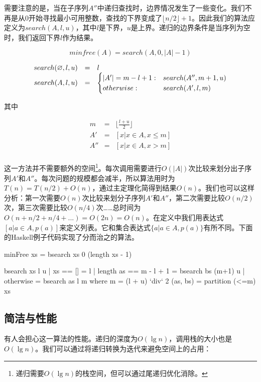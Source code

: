 \documentclass[b5paper]{ctexart}
\begin{document}
需要注意的是，当在子序列$A''$中递归查找时，边界情况发生了一些变化。我们不再是从0开始寻找最小可用整数，查找的下界变成了$\lfloor n/2 \rfloor + 1$。因此我们的算法应定义为$search(A, l, u)$，其中$l$是下界，$u$是上界。递归的边界条件是当序列为空时，我们返回下界$l$作为结果。

\[
minfree(A) = search(A, 0, |A|-1)
\]

\[
\begin{array}{rcl}
search(\varnothing, l, u) & = & l \\
search(A, l, u) & = & \begin{cases}
       |A'| = m - l + 1 : & search(A'', m+1, u) \\
       otherwise : & search(A',  l, m) \\
\end{cases}
\end{array}
\]

其中

\[ \begin{array}{rcl}
m & = & \displaystyle \lfloor \frac{l+u}{2} \rfloor \\
A' & = & [ x | x \in A, x \leq m ] \\
A''& = & [ x | x \in A, x > m ] \\
\end{array} \]

这一方法并不需要额外的空间\footnote{递归需要$O(\lg n)$的栈空间，但可以通过尾递归优化消除。}。每次调用需要进行$O(|A|)$次比较来划分出子序列$A'$和$A''$。每次问题的规模都会减半，所以算法用时为$T(n) = T(n/2) + O(n)$，通过主定理化简得到结果$O(n)$。我们也可以这样分析：第一次需要$O(n)$次比较来划分子序列$A'$和$A''$，第二次需要比较$O(n/2)$次，第三次需要比较$O(n/4)$次……总时间为$O(n + n/2 + n/4 + ...) = O(2n) = O(n)$。在定义中我们用表达式$[a | a \in A, p(a)]$来定义列表。它和集合表达式$\{a | a \in A, p(a) \}$有所不同。下面的Haskell例子代码实现了分而治之的算法。

\lstset{frame = single}
\begin{Haskell}
minFree xs = bsearch xs 0 (length xs - 1)

bsearch xs l u | xs == [] = l
               | length as == m - l + 1 = bsearch bs (m+1) u
               | otherwise = bsearch as l m
    where
      m = (l + u) `div` 2
      (as, bs) = partition (<=m) xs
\end{Haskell}

\subsection*{简洁与性能}
有人会担心这一算法的性能。递归的深度为$O(\lg n)$，调用栈的大小也是$O(\lg n)$。我们可以通过将递归转换为迭代来避免空间上的占用：
\end{document}
